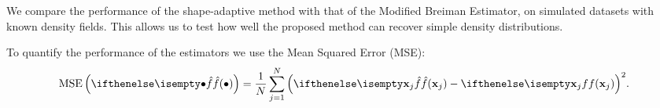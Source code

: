 We compare the performance of the shape-adaptive method with that of the Modified Breiman Estimator, on simulated datasets with known density fields. This allows us to test how well the proposed method can recover simple density distributions. 

To quantify the performance of the estimators we use the Mean Squared Error (MSE):
\begin{equation*}
	\varMSE{\varEstimatedDensityFunction{\bullet}} = \frac{1}{\varNumPatterns} \sum_{\itXs = 1}^{\varNumPatterns} {\left(\varEstimatedDensityFunction{\varPattern[\itXs]} - \varDensityFunction{\varPattern[\itXs]} \right)}^2.
\end{equation*}


